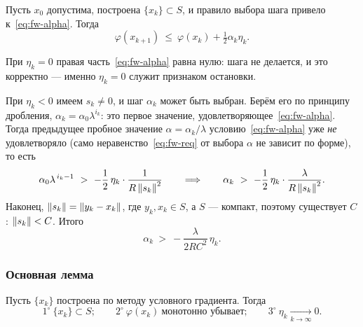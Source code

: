 \begin{remark}
Пусть $x_0$ допустима, построена $\{x_k\} \subset S$, и правило выбора шага
привело к~\eqref{eq:fw-alpha}. Тогда
\begin{equation}\label{eq:fw-1}
  \varphi(x_{k+1}) \ \le\ \varphi(x_k) + \tfrac12 \alpha_k \eta_k .
\end{equation}
\end{remark}

\begin{idea}
При $\eta_k = 0$ правая часть~\eqref{eq:fw-alpha} равна нулю: шага не делается,
и это корректно — именно $\eta_k = 0$ служит признаком остановки.

При $\eta_k < 0$ имеем $s_k \ne 0$, и шаг $\alpha_k$ может быть выбран.
Берём его по принципу дробления, $\alpha_k = \alpha_0 \lambda^{i_k}$: это первое
значение, удовлетворяющее~\eqref{eq:fw-alpha}. Тогда предыдущее пробное
значение $\alpha = \alpha_k / \lambda$ условию~\eqref{eq:fw-alpha} уже
\emph{не} удовлетворяло (само неравенство~\eqref{eq:fw-req} от выбора $\alpha$
не зависит по форме), то есть
\[
  \alpha_0 \lambda^{\,i_k - 1} \ >\ -\frac{1}{2}\,\eta_k \cdot
  \frac{1}{R\left\lVert s_k \right\rVert^2}
  \qquad\Longrightarrow\qquad
  \alpha_k \ >\ -\frac{1}{2}\,\eta_k \cdot \frac{\lambda}{R\left\lVert s_k \right\rVert^2} .
\]
Наконец, $\left\lVert s_k \right\rVert = \left\lVert y_k - x_k \right\rVert$, где $y_k, x_k \in S$, а $S$ —
компакт, поэтому существует $C$: $\left\lVert s_k \right\rVert < C$. Итого
\begin{equation}\label{eq:fw-2}
  \alpha_k \ >\ -\frac{\lambda}{2RC^2}\, \eta_k .
\end{equation}
\end{idea}

\subsubsection*{Основная лемма}

\begin{lemma}\label{lem:fw}
Пусть $\{x_k\}$ построена по методу условного градиента. Тогда
\[
  1^\circ\ \{x_k\} \subset S ;
  \qquad
  2^\circ\ \varphi(x_k) \ \text{монотонно убывает} ;
  \qquad
  3^\circ\ \eta_k \xrightarrow[k \to \infty]{} 0 .
\]
\end{lemma}

